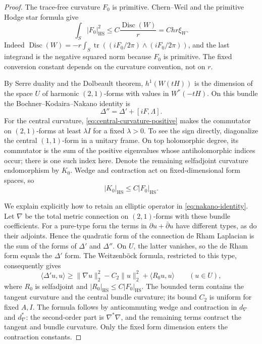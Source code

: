 \begin{proof}
The trace-free curvature $F_0$ is primitive.  Chern--Weil and the
primitive Hodge star formula give
\begin{equation}\label{eq:tracefree-energy}
 \int_S|F_0|_{\mathrm{HS}}^2\le C\frac{\operatorname{Disc}(W)}r
   =Chr\xi_W.
\end{equation}
Indeed
$\operatorname{Disc}(W)=-r\int_S
\operatorname{tr}((iF_0/2\pi)\wedge(iF_0/2\pi))$,
and the last integrand is the negative squared norm because
$F_0$ is primitive.  The fixed conversion constant depends on the
curvature convention, not on $r$.

By Serre duality and the Dolbeault theorem, $h^1(W(tH))$ is the
dimension of the space $U$ of harmonic $(2,1)$-forms with values in
$W^*(-tH)$.  On this bundle the Bochner--Kodaira--Nakano identity
\cite[Chapter~VII, Corollary~1.3]{DemaillyCADG} is
\begin{equation}\label{eq:nakano-identity}
 \Delta''=\Delta'+[iF,\Lambda].
\end{equation}
For the central curvature, \eqref{eq:central-curvature-positive}
makes the commutator on $(2,1)$-forms at least $\lambda I$ for a
fixed $\lambda>0$.  To see the sign directly, diagonalize the
central $(1,1)$-form in a unitary frame.  On top holomorphic
degree, its commutator is the sum of the positive eigenvalues
whose antiholomorphic indices occur; there is one such index
here.  Denote the remaining selfadjoint curvature endomorphism by
$K_0$.  Wedge and contraction act on fixed-dimensional form
spaces, so
\begin{equation}\label{eq:curvature-endomorphisms}
 |K_0|_{\mathrm{HS}}\le C|F_0|_{\mathrm{HS}}.
\end{equation}

We explain explicitly how to retain an elliptic operator in
\eqref{eq:nakano-identity}.  Let $\nabla$ be the total metric
connection on $(2,1)$-forms with these bundle coefficients.
For a pure-type form the terms in $\partial u+\bar\partial u$
have different types, as do their adjoints.  Hence the quadratic
form of the connection de Rham Laplacian is the sum of the forms
of $\Delta'$ and $\Delta''$.  On $U$, the latter vanishes, so the
de Rham form equals the $\Delta'$ form.  The Weitzenböck formula,
restricted to this type, consequently gives
\begin{equation}\label{eq:weitzenbock-on-harmonics}
 \langle\Delta'u,u\rangle
 \ge\|\nabla u\|_2^2-C_2\|u\|_2^2+\langle R_0u,u\rangle
 \qquad(u\in U),
\end{equation}
where $R_0$ is selfadjoint and
$|R_0|_{\mathrm{HS}}\le C|F_0|_{\mathrm{HS}}$.
The bounded term contains the tangent curvature and the central
bundle curvature; its bound $C_2$ is uniform for fixed $A,I$.
The formula follows by anticommuting wedge and contraction in
$d_\nabla$ and $d_\nabla^*$: the second-order part is
$\nabla^*\nabla$, and the remaining terms contract the tangent
and bundle curvature.  Only the fixed form dimension enters
the contraction constants.


\end{proof}

